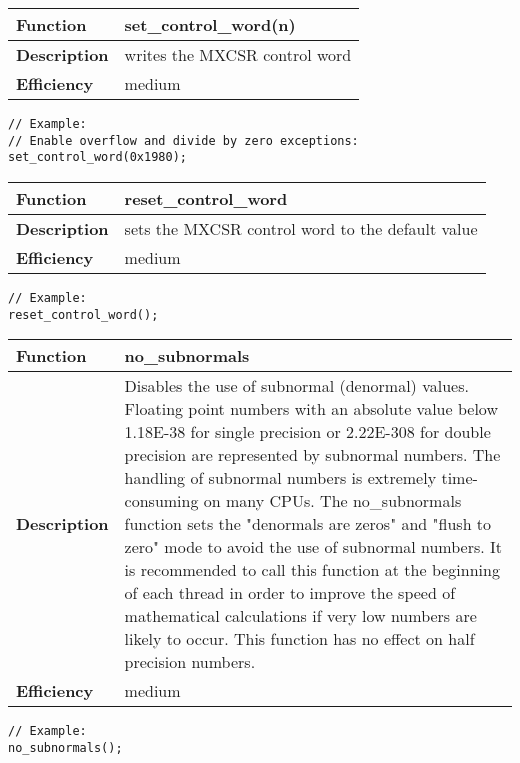 \documentclass[vcl_manual.tex]{subfiles}
\begin{document}
\begin{tabular}{|p{25mm}|p{100mm}|}
\hline
\bfseries Function & set\_control\_word(n) \\ \hline
\bfseries Description & writes the MXCSR control word \\ \hline
\bfseries Efficiency & medium \\ \hline
\end{tabular}
\begin{lstlisting}[frame=none]
// Example:  
// Enable overflow and divide by zero exceptions:
set_control_word(0x1980); 
\end{lstlisting}


\begin{tabular}{|p{25mm}|p{100mm}|}
\hline
\bfseries Function & reset\_control\_word \\ \hline
\bfseries Description & sets the MXCSR control word to the default value \\ \hline
\bfseries Efficiency & medium \\ \hline
\end{tabular}
\begin{lstlisting}[frame=none]
// Example:
reset_control_word();
\end{lstlisting}

\label{noSubnormals}
\begin{tabular}{|p{25mm}|p{100mm}|}
\hline
\bfseries Function & no\_subnormals \\ \hline
\bfseries Description & Disables the use of subnormal (denormal) values. \newline
Floating point numbers with an absolute value below  \newline
1.18E-38 for single precision or 2.22E-308 for double precision are represented by subnormal numbers. The handling of subnormal numbers is extremely time-consuming on many CPUs. The no\_subnormals function sets the "denormals are zeros" and "flush to zero" mode to avoid the use of subnormal numbers. It is recommended to call this function at the beginning of each thread in order to improve the speed of mathematical calculations if very low numbers are likely to occur. This function has no effect on half precision numbers. \\ \hline
\bfseries Efficiency & medium \\ \hline
\end{tabular}
\begin{lstlisting}[frame=none]
// Example:
no_subnormals();
\end{lstlisting}
\end{document}
